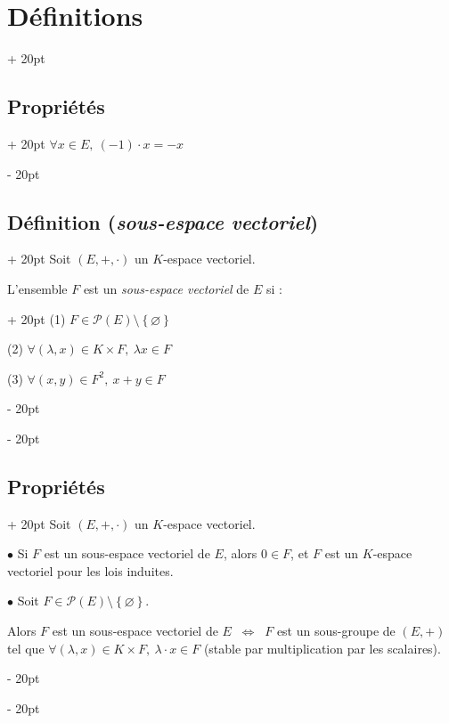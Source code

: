\documentclass[a4paper, 12pt, twoside]{article}
\newcommand{\set}[1]{\left\{ #1 \right\}}
\newcommand{\ssi}{\ \Leftrightarrow \ }
\newcommand{\ind}[1][20pt]{\advance\leftskip + #1}
\newcommand{\deind}[1][20pt]{\advance\leftskip - #1}
\newenvironment{indt}[2][20pt]{#2 \par \ind[#1]}{\par \deind} %
\begin{document}
\begin{indt}{\section{Définitions}}
\begin{indt}{\subsection{Propriétés}}
            $\forall x \in E,\ (-1) \cdot x = -x$
        \end{indt}
        
        \vspace{12pt}
        
        \begin{indt}{\subsection{Définition (\textit{sous-espace vectoriel})}}
            Soit $(E, +, \cdot)$ un $K$-espace vectoriel.
            
            \begin{indt}{L'ensemble $F$ est un \textit{sous-espace vectoriel} de $E$ si :}
                (1) $F \in \mathcal P(E) \setminus \set \varnothing$
                
                (2) $\forall (\lambda, x) \in K \times F,\ \lambda x \in F$
                
                (3) $\forall (x, y) \in F^2,\ x + y \in F$
            \end{indt}
        \end{indt}
            
        \vspace{12pt}
        
        \begin{indt}{\subsection{Propriétés}}
            Soit $(E, +, \cdot)$ un $K$-espace vectoriel.
            
            \vspace{6pt}
            
            $\bullet$ Si $F$ est un sous-espace vectoriel de $E$, alors $0 \in F$, et $F$ est un $K$-espace vectoriel pour les lois induites.
            
            \vspace{6pt}
            
            $\bullet$ Soit $F \in \mathcal P(E) \setminus \set \varnothing$.
            
            Alors $F$ est un sous-espace vectoriel de $E$ $\ssi$ $F$ est un sous-groupe de $(E, +)$ tel que $\forall (\lambda, x) \in K \times F,\ \lambda \cdot x \in F$ (stable par multiplication par les scalaires).
            
            \vspace{12pt}
            

\end{indt}
\end{indt}
\end{document}
